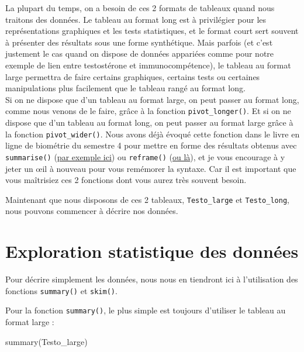 \documentclass[
  french,
  a4paper,
  DIV=11,
  numbers=noendperiod,
  oneside]{scrreprt}
\newenvironment{Shaded}{}{}
\newcommand{\FunctionTok}[1]{\textcolor[rgb]{0.44,0.26,0.76}{#1}}
\newcommand{\NormalTok}[1]{\textcolor[rgb]{0.14,0.16,0.18}{#1}}
\begin{document}
La plupart du temps, on a besoin de ces 2 formats de tableaux quand nous
traitons des données. Le tableau au format long est à privilégier pour
les représentations graphiques et les tests statistiques, et le format
court sert souvent à présenter des résultats sous une forme synthétique.
Mais parfois (et c'est justement le cas quand on dispose de données
appariées comme pour notre exemple de lien entre testostérone et
immunocompétence), le tableau au format large permettra de faire
certains graphiques, certains tests ou certaines manipulations plus
facilement que le tableau rangé au format long.\\
Si on ne dispose que d'un tableau au format large, on peut passer au
format long, comme nous venons de le faire, grâce à la fonction
\texttt{pivot\_longer()}. Et si on ne dispose que d'un tableau au format
long, on peut passer au format large grâce à la fonction
\texttt{pivot\_wider()}. Nous avons déjà évoqué cette fonction dans le
livre en ligne de biométrie du semestre 4 pour mettre en forme des
résultats obtenus avec \texttt{summarise()}
(\href{https://besibo.github.io/BiometrieS4/01-dispersion.html\#grouper-par-plus-dune-variable}{par
exemple ici}) ou \texttt{reframe()}
(\href{https://besibo.github.io/BiometrieS4/01-dispersion.html\#créer-des-résumés-avec-la-fonction-reframe}{ou
là}), et je vous encourage à y jeter un œil à nouveau pour vous
remémorer la syntaxe. Car il est important que vous maîtrisiez ces 2
fonctions dont vous aurez très souvent besoin.

Maintenant que nous disposons de ces 2 tableaux, \texttt{Testo\_large}
et \texttt{Testo\_long}, nous pouvons commencer à décrire nos données.

\section{Exploration statistique des
données}\label{exploration-statistique-des-donnuxe9es}

Pour décrire simplement les données, nous nous en tiendront ici à
l'utilisation des fonctions \texttt{summary()} et \texttt{skim()}.

Pour la fonction \texttt{summary()}, le plus simple est toujours
d'utiliser le tableau au format large :

\begin{Shaded}
\begin{Highlighting}[]
\FunctionTok{summary}\NormalTok{(Testo\_large)}
\end{Highlighting}
\end{Shaded}
\end{document}
